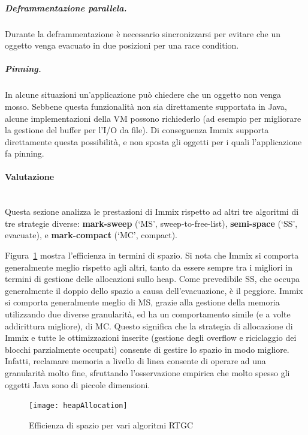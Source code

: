 \subparagraph{Deframmentazione parallela.} Durante la deframmentazione è necessario sincronizzarsi per evitare che un oggetto venga evacuato in due posizioni per una race condition. 

\subparagraph{Pinning.} In alcune situazioni un'applicazione può chiedere che un oggetto non venga mosso. Sebbene questa funzionalità non sia direttamente supportata in Java, alcune implementazioni della VM possono richiederlo (ad esempio per migliorare la gestione del buffer per l'I/O da file). Di conseguenza Immix supporta direttamente questa possibilità, e non sposta gli oggetti per i quali l'applicazione fa pinning.

\paragraph{Valutazione} \mbox{} \\
Questa sezione analizza le prestazioni di Immix rispetto ad altri tre algoritmi di tre strategie diverse: \textbf{mark-sweep} (‘MS’, sweep-to-free-list), \textbf{semi-space} (‘SS’, evacuate),
e \textbf{mark-compact} (‘MC’, compact). 

Figura~\ref{fig:heapallocation} mostra l'efficienza in termini di spazio. Si nota che Immix si comporta generalmente meglio rispetto agli altri, tanto da essere sempre tra i migliori in termini di gestione delle allocazioni sullo heap. Come prevedibile SS, che occupa generalmente il doppio dello spazio a causa dell'evacuazione, è il peggiore. Immix si comporta generalmente meglio di MS, grazie alla gestione della memoria utilizzando due diverse granularità, ed ha un comportamento simile (e a volte addirittura migliore), di MC. Questo significa che la strategia di allocazione di Immix e tutte le ottimizzazioni inserite (gestione degli overflow e riciclaggio dei blocchi parzialmente occupati) consente di gestire lo spazio in modo migliore. Infatti, reclamare memoria a livello di linea consente di operare ad una granularità molto fine, sfruttando l'osservazione empirica che molto spesso gli oggetti Java sono di piccole dimensioni.
\begin{figure}[h]
	\centering
	\texttt{[image: heapAllocation]}
	\caption[Efficienza di spazio]{Efficienza di spazio per vari algoritmi RTGC}
	\label{fig:heapallocation}
\end{figure}

